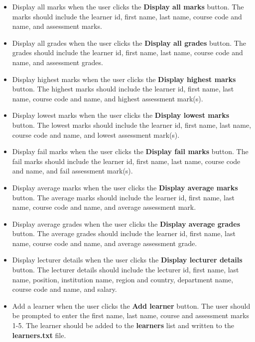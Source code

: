 \documentclass{article}
\begin{document}
\begin{itemize}
\begin{itemize}
        Display the course details when the user clicks the \textbf{Display course details} button. The course details should include the course code, name, description, credits, fees, institution name, region and country, and department name.
        \item Display all marks when the user clicks the \textbf{Display all marks} button. The marks should include the learner id, first name, last name, course code and name, and assessment marks.
        \item Display all grades when the user clicks the \textbf{Display all grades} button. The grades should include the learner id, first name, last name, course code and name, and assessment grades.
        \item Display highest marks when the user clicks the \textbf{Display highest marks} button. The highest marks should include the learner id, first name, last name, course code and name, and highest assessment mark(s).
        \item Display lowest marks when the user clicks the \textbf{Display lowest marks} button. The lowest marks should include the learner id, first name, last name, course code and name, and lowest assessment mark(s).
        \item Display fail marks when the user clicks the \textbf{Display fail marks} button. The fail marks should include the learner id, first name, last name, course code and name, and fail assessment mark(s).
        \item Display average marks when the user clicks the \textbf{Display average marks} button. The average marks should include the learner id, first name, last name, course code and name, and average assessment mark.
        \item Display average grades when the user clicks the \textbf{Display average grades} button. The average grades should include the learner id, first name, last name, course code and name, and average assessment grade.
        \item Display lecturer details when the user clicks the \textbf{Display lecturer details} button. The lecturer details should include the lecturer id, first name, last name, position, institution name, region and country, department name, course code and name, and salary.
        \item Add a learner when the user clicks the \textbf{Add learner} button. The user should be prompted to enter the first name, last name, course and assessment marks 1-5. The learner should be added to the \textbf{learners} list and written to the \textbf{learners.txt} file. 

\end{itemize}
\end{itemize}
\end{document}
